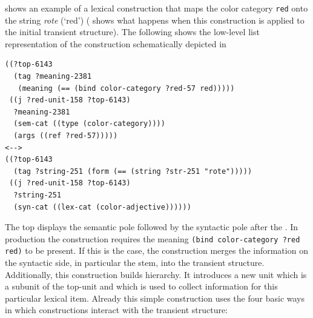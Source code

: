  shows an example of a lexical construction that maps 
the color category {\footnotesize\tt red} onto the string \textit{rote} (`red')
( shows what happens
when this construction is applied to the initial transient structure). 
The following shows the low-level list representation of the construction
schematically depicted in 
\ea\label{e:red-lex-list}
\begin{lstlisting} 
((?top-6143
  (tag ?meaning-2381 
   (meaning (== (bind color-category ?red-57 red)))))
 ((j ?red-unit-158 ?top-6143)
  ?meaning-2381
  (sem-cat ((type (color-category))))
  (args ((ref ?red-57)))))
<-->
((?top-6143
  (tag ?string-251 (form (== (string ?str-251 "rote")))))
 ((j ?red-unit-158 ?top-6143)
  ?string-251
  (syn-cat ((lex-cat (color-adjective))))))
\end{lstlisting}\z
The top displays the semantic pole followed by the syntactic pole after the 
{\footnotesize\tt <-->}. In production the construction requires
the meaning {\footnotesize\tt (bind color-category ?red red)} to be present.
If this is the case, the construction merges the information 
on the syntactic side, in particular the stem, into the transient structure.
Additionally, this construction builds hierarchy. It introduces a new unit
which is a subunit of the top-unit and which is used to collect
information for this particular lexical item. Already this simple 
construction uses the four basic ways in which constructions
interact with the transient structure:


